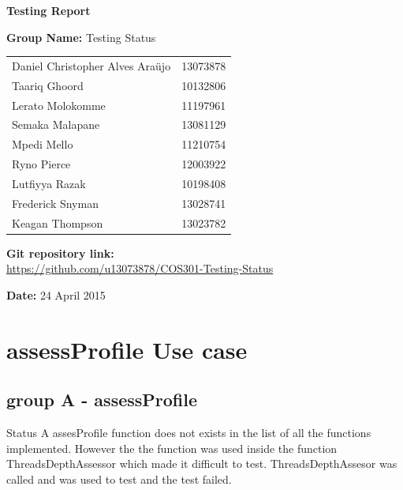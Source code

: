 \documentclass[a4paper,12pt]{article}
\begin{document}
\begin{center}

\Huge\textbf{Testing Report\\}
																											
\vspace{2 cm}

\LARGE\textbf{Group Name:} Testing Status\newline
 
\vspace{0.5 cm}
\begin{tabular}{lr}
Daniel Christopher Alves Ara\"{u}jo&13073878\\ 
Taariq Ghoord&10132806\\
Lerato Molokomme&11197961\\
Semaka Malapane&13081129\\
Mpedi Mello&11210754\\
Ryno Pierce&12003922\\
Lutfiyya Razak&10198408\\
Frederick Snyman&13028741\\
Keagan Thompson&13023782\\
\end{tabular}

\vspace{1cm}
\textbf{Git repository link:\\}
\url{https://github.com/u13073878/COS301-Testing-Status}

\vspace{1cm}
\textbf{Date:} 24 April 2015
\end{center}
\newpage

\tableofcontents
{}
\newpage


\section{assessProfile Use case}
\subsection{group A - assessProfile}
Status A assesProfile function does not exists in the list of all the functions implemented. However the the function was used
inside the function ThreadsDepthAssessor which made it difficult to test. ThreadsDepthAssesor was called and was used to test 
and the test failed.
\end{document}
